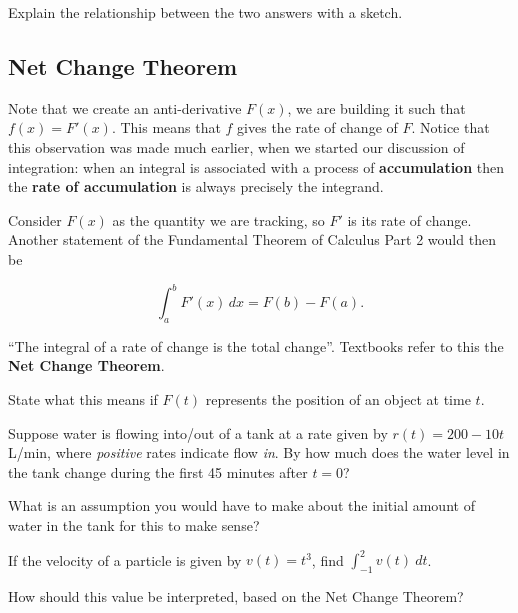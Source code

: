 Explain the relationship between the two answers with a sketch.

\newpage

\subsection*{Net Change Theorem}

Note that we create an anti-derivative $F(x)$, we are building it such
that $f(x)=F'(x)$. This means that $f$ gives the rate of change of
$F$.  Notice that this observation was made much earlier, when we
started our discussion of integration: when an integral is associated
with a process of {\bf accumulation} then the {\bf rate of accumulation} is
always precisely the integrand.  

\newpage

Consider $F(x)$ as the quantity we are tracking, so $F'$ is its rate
of change.  Another statement of the Fundamental Theorem of Calculus
Part 2 would then be

\begin{boxnote} \label{thm:netchange}
\[ \int_a^bF'(x)\,dx=F(b)-F(a).
\]
\end{boxnote}

``The integral of a rate of change is the total change''.  Textbooks
refer to this the {\bf Net Change Theorem}.  \bigskip

\problem State what this means if $F(t)$ represents the position of an
object at time $t$.


\newpage

\begin{problem}
  Suppose water is flowing into/out of a tank at a rate given by $r(t)
  = 200 -10t$ L/min, where {\em positive} rates indicate flow {\em
    in}.  By how much does the water level in the tank change during
  the first 45 minutes after $t=0$?   
\end{problem}

\newpage

\problem What is an assumption you would have to make about the
  initial amount of water in the tank for this to make sense?

\newpage
\problem If the velocity of a particle is given by $v(t) = t^3$, find
$\int_{-1}^{2} v(t)~dt$.

\vfill
\vfill

How should this value be interpreted, based on the Net Change Theorem?

\vfill



